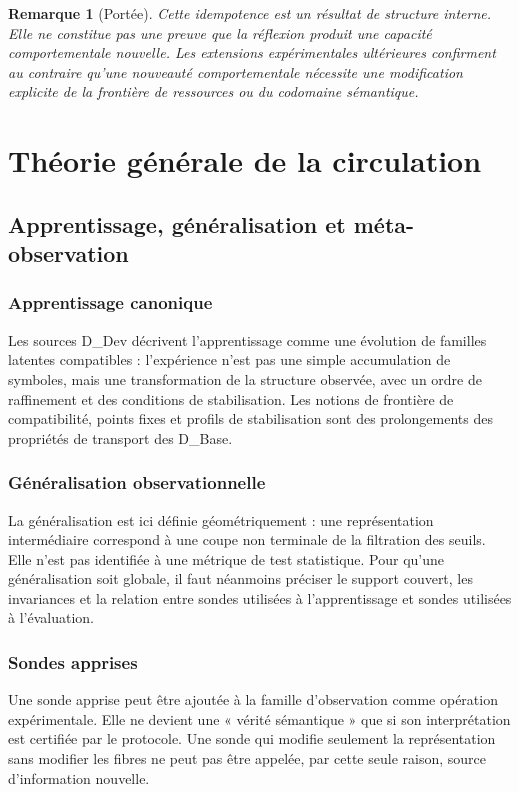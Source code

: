 \documentclass[11pt,a4paper,openany]{book}
\newtheorem{remark}[definition]{Remarque}
\begin{document}
\begin{remark}[Portée]
Cette idempotence est un résultat de structure interne. Elle ne constitue pas une preuve que la réflexion produit une capacité comportementale nouvelle. Les extensions expérimentales ultérieures confirment au contraire qu'une nouveauté comportementale nécessite une modification explicite de la frontière de ressources ou du codomaine sémantique.
\end{remark}

\part{Théorie générale de la circulation}

\chapter{Apprentissage, généralisation et méta-observation}
\section{Apprentissage canonique}
Les sources D\_Dev décrivent l'apprentissage comme une évolution de familles latentes compatibles : l'expérience n'est pas une simple accumulation de symboles, mais une transformation de la structure observée, avec un ordre de raffinement et des conditions de stabilisation. Les notions de frontière de compatibilité, points fixes et profils de stabilisation sont des prolongements des propriétés de transport des D\_Base.

\section{Généralisation observationnelle}
La généralisation est ici définie géométriquement : une représentation intermédiaire correspond à une coupe non terminale de la filtration des seuils. Elle n'est pas identifiée à une métrique de test statistique. Pour qu'une généralisation soit globale, il faut néanmoins préciser le support couvert, les invariances et la relation entre sondes utilisées à l'apprentissage et sondes utilisées à l'évaluation.

\section{Sondes apprises}
Une sonde apprise peut être ajoutée à la famille d'observation comme opération expérimentale. Elle ne devient une « vérité sémantique » que si son interprétation est certifiée par le protocole. Une sonde qui modifie seulement la représentation sans modifier les fibres ne peut pas être appelée, par cette seule raison, source d'information nouvelle.
\end{document}
